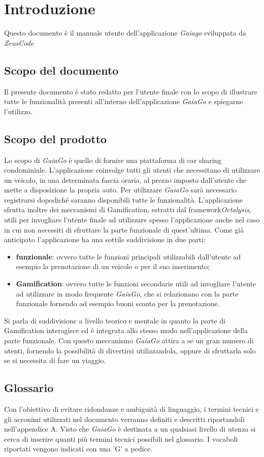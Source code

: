 \section{Introduzione}
Questo documento è il manuale utente dell'applicazione \textit{Gaiago} sviluppata da \textit{ZeusCode}
\subsection{Scopo del documento}
Il presente documento è stato redatto per l’utente finale con lo scopo di illustrare tutte le funzionalità presenti all'interno dell'applicazione \textit{GaiaGo} e spiegarne l’utilizzo.

\subsection{Scopo del prodotto}
Lo scopo di \textit{GaiaGo} è quello di fornire una piattaforma di car sharing condominiale. L'applicazione coinvolge tutti gli utenti che necessitano di utilizzare un veicolo, in una determinata fascia oraria, al prezzo imposto dall'utente che mette a disposizione la propria auto. Per utilizzare \textit{GaiaGo} sarà necessario registrarsi dopodiché saranno disponibili tutte le funzionalità. L'applicazione sfrutta inoltre dei meccanismi di Gamification\glosp, estratti dal framework\glosp \textit{Octalysis}\glosp, utili per invogliare l'utente finale ad utilizzare spesso l'applicazione anche nel caso in cui non necessiti di sfruttare la parte funzionale di quest'ultima. Come già anticipato l'applicazione ha una sottile suddivisione in due parti:
\begin{itemize}
	\item \textbf{funzionale}: ovvero tutte le funzioni principali utilizzabili dall'utente ad esempio la prenotazione di un veicolo o per il suo inserimento; 
	\item \textbf{Gamification}: ovvero tutte le funzioni secondarie utili ad invogliare l'utente ad utilizzare in modo frequente \textit{GaiaGo}, che si relazionano con la parte funzionale fornendo ad esempio buoni sconto per la prenotazione.
\end{itemize}
 Si parla di suddivisione a livello teorico e mentale in quanto la parte di Gamification interagisce ed è integrata allo stesso modo nell'applicazione della parte funzionale.
 Con questo meccanismo \textit{GaiaGo} attira a se un gran numero di utenti, fornendo la possibilità di divertirsi utilizzandola, oppure di sfruttarla solo se si necessita di fare un viaggio.
\subsection{Glossario}
Con l'obiettivo di evitare ridondanze e ambiguità di linguaggio, i termini tecnici e gli acronimi
utilizzati nel documento verranno definiti e descritti riportandoli nell'appendice A.
Visto che \textit{GaiaGo} è destinata a un qualsiasi livello di utenza si cerca di inserire quanti più termini tecnici possibili nel glossario.
I vocaboli riportati vengono indicati con una 'G' a pedice.